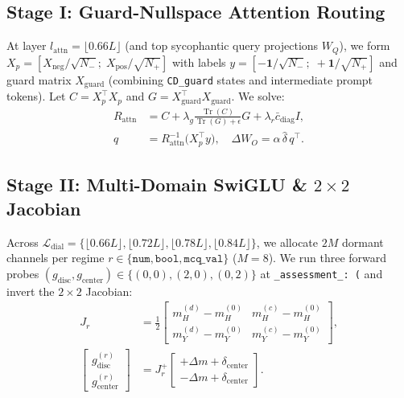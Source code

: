 \documentclass[10pt,twocolumn]{article}
\begin{document}
\subsection{Stage I: Guard-Nullspace Attention Routing}
At layer $l_{\mathrm{attn}} = \lfloor 0.66L \rfloor$ (and top sycophantic query projections $W_Q$), we form $X_p = [X_{\mathrm{neg}}/\sqrt{N_-};\; X_{\mathrm{pos}}/\sqrt{N_+}]$ with labels $y = [-\mathbf{1}/\sqrt{N_-};\; +\mathbf{1}/\sqrt{N_+}]$ and guard matrix $X_{\mathrm{guard}}$ (combining \texttt{CD\_guard} states and intermediate prompt tokens). Let $C = X_p^\top X_p$ and $G = X_{\mathrm{guard}}^\top X_{\mathrm{guard}}$. We solve:
\begin{equation}
\begin{aligned}
R_{\mathrm{attn}} &= C + \lambda_g \frac{\operatorname{Tr}(C)}{\operatorname{Tr}(G) + \epsilon} G + \lambda_r \bar{c}_{\mathrm{diag}} I, \\
q &= R_{\mathrm{attn}}^{-1} \big(X_p^\top y\big), \quad \Delta W_O = \alpha \, \hat{\delta} \, q^\top.
\end{aligned}
\end{equation}

\subsection{Stage II: Multi-Domain SwiGLU \& $2\times 2$ Jacobian}
Across $\mathcal{L}_{\mathrm{dial}} = \{ \lfloor 0.66L \rfloor, \lfloor 0.72L \rfloor, \lfloor 0.78L \rfloor, \lfloor 0.84L \rfloor \}$, we allocate $2M$ dormant channels per regime $r \in \{\texttt{num}, \texttt{bool}, \texttt{mcq\_val}\}$ ($M=8$). We run three forward probes $(g_{\mathrm{disc}}, g_{\mathrm{center}}) \in \{(0,0), (2,0), (0,2)\}$ at \texttt{\_assessment\_: (} and invert the $2\times 2$ Jacobian:
\begin{equation}
\begin{aligned}
J_r &= \frac{1}{2}\begin{bmatrix} m_H^{(d)} - m_H^{(0)} & m_H^{(c)} - m_H^{(0)} \\ m_Y^{(d)} - m_Y^{(0)} & m_Y^{(c)} - m_Y^{(0)} \end{bmatrix}, \\
\begin{bmatrix} g_{\mathrm{disc}}^{(r)} \\ g_{\mathrm{center}}^{(r)} \end{bmatrix} &= J_r^+ \begin{bmatrix} +\Delta m + \delta_{\mathrm{center}} \\ -\Delta m + \delta_{\mathrm{center}} \end{bmatrix}.
\end{aligned}
\end{equation}
\end{document}
